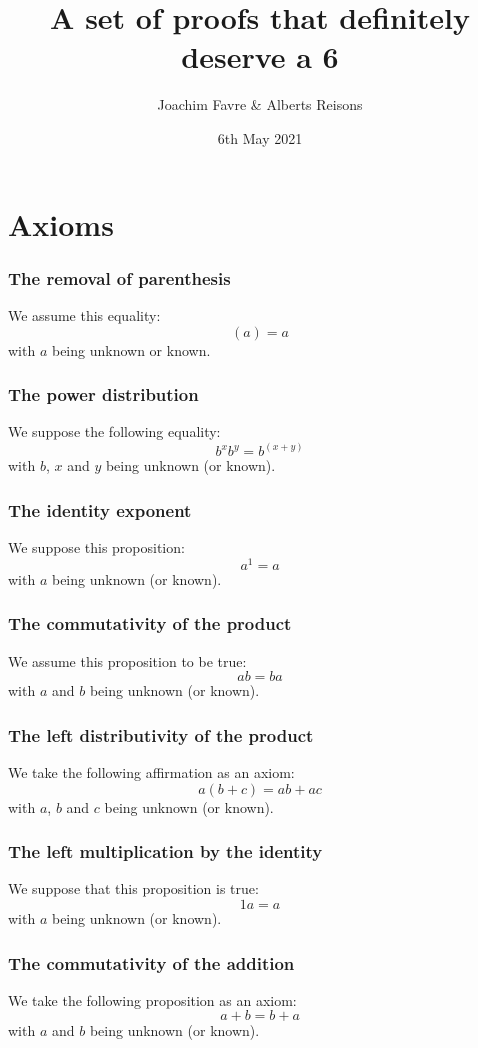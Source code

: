 \documentclass[a4paper]{article}
\title{A set of proofs that definitely deserve a 6}
\author{Joachim Favre \& Alberts Reisons}
\date{6th May 2021}
\let\oldpart\part
\newcommand{\parttitle}{}
\renewcommand{\part}[1]{\oldpart{#1}\renewcommand{\parttitle}{#1}}
\begin{document}
\maketitle
\tableofcontents
\newpage

\part{Axioms}


\section{The removal of parenthesis\label{6}}
We assume this equality:
\[\left(a\right) = a\]
with $a$ being unknown or known.


\section{The power distribution\label{7}}
We suppose the following equality:
\[b^x  b^y = b^{\left(x + y\right)}\]
with $b$, $x$ and $y$ being unknown (or known).


\section{The identity exponent\label{8}}
We suppose this proposition:
\[a^1 = a\]
with $a$ being unknown (or known).


\section{The commutativity of the product\label{10}}
We assume this proposition to be true:
\[ab = ba\]
with $a$ and $b$ being unknown (or known).


\section{The left distributivity of the product\label{11}}
We take the following affirmation as an axiom:
\[a\left(b + c\right) = ab + ac\]
with $a$, $b$ and $c$ being unknown (or known).


\section{The left multiplication by the identity\label{12}}
We suppose that this proposition is true:
\[1a = a\]
with $a$ being unknown (or known).


\section{The commutativity of the addition\label{20}}
We take the following proposition as an axiom:
\[a + b = b + a\]
with $a$ and $b$ being unknown (or known).
\newpage
\end{document}
